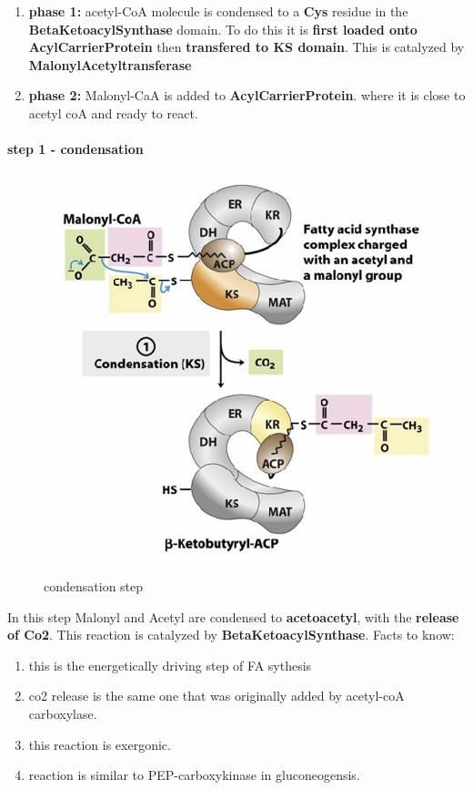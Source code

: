 \documentclass[../main.tex]{subfiles}
\begin{document}
\begin{enumerate}
    \item \textbf{phase 1:} acetyl-CoA  molecule is 
    condensed to a \textbf{Cys} residue in the \textbf{\gls{BetaKetoacylSynthase}} domain. To do this it is\textbf{ first loaded onto \gls{AcylCarrierProtein}} then \textbf{transfered to KS domain}. This is catalyzed by \textbf{\gls{MalonylAcetyltransferase}}

    \item \textbf{phase 2:} Malonyl-CaA is added to \textbf{\gls{AcylCarrierProtein}}. where it is close to acetyl coA and ready to react.
\end{enumerate}


\paragraph{step 1 - condensation}
\begin{figure}[H]
    \centering
    \includegraphics[width=0.5\linewidth]{condensation.png}
    \caption{condensation step}
    \label{fig:enter-label}
\end{figure}

In this step Malonyl and Acetyl are condensed to \textbf{\gls{acetoacetyl}}, with the \textbf{release of Co2}. This reaction is catalyzed by \textbf{\gls{BetaKetoacylSynthase}}. Facts to know:
\begin{enumerate}
    \item this is the energetically driving step of FA sythesis
    \item co2 release is the same one that was originally added by acetyl-coA carboxylase.
    \item this reaction is exergonic.
    \item reaction is similar to  PEP-carboxykinase in gluconeogensis.
\end{enumerate}
\end{document}
